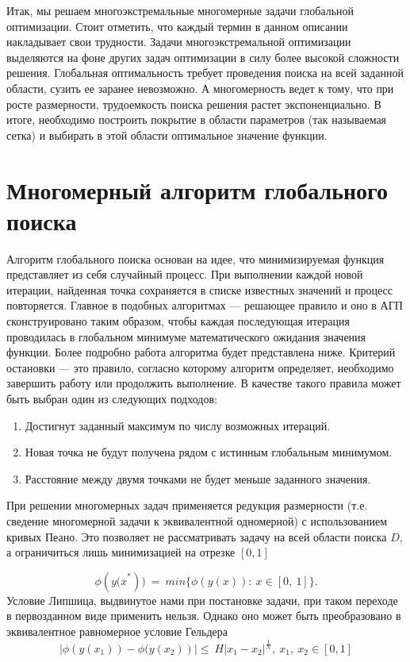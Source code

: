 \documentclass[12pt, a4paper, russian]{article}
\begin{document}
Итак, мы решаем многоэкстремальные многомерные задачи глобальной оптимизации. Стоит отметить, что каждый термин в данном описании накладывает свои трудности. Задачи многоэкстремальной оптимизации выделяются на фоне других задач оптимизации в силу более высокой сложности решения. Глобальная оптимальность требует проведения поиска на всей заданной области, сузить ее заранее невозможно. А многомерность ведет к тому, что при росте размерности, трудоемкость поиска решения растет экспоненциально. В итоге, необходимо построить покрытие в области параметров (так называемая сетка) и выбирать в этой области оптимальное значение функции. 


\section{Многомерный алгоритм глобального поиска}

Алгоритм глобального поиска основан на идее, что минимизируемая функция представляет из себя случайный процесс. При выполнении каждой новой итерации, найденная точка сохраняется в списке известных значений и  процесс повторяется. Главное в подобных алгоритмах --- решающее правило и оно в АГП сконструировано таким образом, чтобы каждая последующая итерация проводилась в глобальном минимуме математического ожидания значения функции. Более подробно работа алгоритма будет представлена ниже. Критерий остановки --- это правило, согласно которому алгоритм определяет, необходимо завершить работу или продолжить выполнение. В качестве такого правила может быть выбран один из следующих подходов: 
\begin{enumerate}
	\item Достигнут заданный максимум по числу возможных итераций. 
 \item Новая точка не будут получена рядом с истинным глобальным минимумом.
	\item Расстояние между двумя точками не будет меньше заданного значения.
\end{enumerate}

При решении многомерных задач применяется редукция размерности (т.е. сведение многомерной задачи к эквивалентной одномерной) с использованием кривых Пеано. Это позволяет не рассматривать задачу на всей области поиска $D$, а ограничиться лишь минимизацией на отрезке $[0, 1]$

\begin{equation*}
	\phi({y(x}^\ast))\ =\ min\{\phi(y(x)):\ x\in[0,\ 1]\}.
\end{equation*}
Условие Липшица, выдвинутое нами при постановке задачи, при таком переходе в первозданном виде применить нельзя. Однако оно может быть преобразовано в эквивалентное равномерное условие Гельдера
\begin{equation*}
	\left|\phi (y \left(x_1\right))- \phi (y \left(x_2\right)\right )|\le\ H\left|x_1-x_2\right|^\frac{1}{N},\ x_1,\ x_2\in[0,1]		
\end{equation*}
\end{document}

